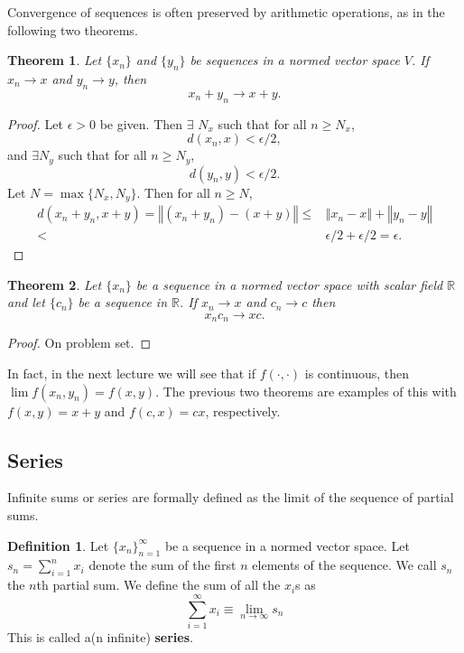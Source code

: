 \documentclass[12pt,reqno]{amsart}
\newtheorem{theorem}{Theorem}[section]
\theoremstyle{definition}
\newtheorem{definition}{Definition}[section]
\def\R{\mathbb{R}}
\newcommand{\norm}[1]{\left\Vert {#1} \right\Vert}
\newcommand{\seq}[1]{\{{#1}_n \}_{n=1}^\infty }
\begin{document}
Convergence of sequences is often preserved by arithmetic
operations, as in the following two theorems.
\begin{theorem}
  Let $\{x_n\}$ and $\{y_n\}$ be sequences in a normed vector space
  $V$. If $x_n \to x$ and $y_n \to y$, then
  \[ x_n + y_n \to x + y. \]
\end{theorem}
\begin{proof}
  Let $\epsilon > 0$ be given. Then $\exists$ $N_x$ such that for all
  $n \geq N_x$, 
  \[ d(x_n,x) < \epsilon/2,\] and $\exists N_y$ such that
  for all $n \geq N_y$,  
  \[ d(y_n,y) < \epsilon/2. \]
  Let $N =\max\{N_x,N_y\}$. Then for all $n \geq N$, 
  \begin{align*}
    d(x_n + y_n,x+y) = \norm{(x_n + y_n) - (x+y)} \leq & \norm{x_n -
      x} + \norm{y_n - y} \\
    < & \epsilon/2 + \epsilon /2  = \epsilon.
  \end{align*}  
\end{proof}
\begin{theorem}
  Let $\{x_n \}$ be a sequence in a normed vector space with scalar
  field $\R$ and let $\{c_n\}$ be a sequence in $\R$. If
  $x_n \to x$ and $c_n \to c$ then 
  \[ x_n c_n \to x c. \]
\end{theorem}
\begin{proof}
  On problem set. 
\end{proof}
In fact, in the next lecture we will see that if $f(\cdot,\cdot)$ is
continuous, then $\lim f(x_n, y_n) = f(x,y)$. The previous two
theorems are examples of this with $f(x,y) = x+y$ and $f(c,x) = c x$,
respectively.

\subsection{Series}

Infinite sums or series are formally defined as the limit of the
sequence of partial sums. 
\begin{definition}
  Let $\seq{x}$ be a sequence in a normed vector space. Let $s_n =
  \sum_{i=1}^n x_i$ denote the sum of the first $n$ elements of the
  sequence. We call $s_n$ the $n$th partial sum. We define the sum of
  all the $x_i$s as
  \[ \sum_{i=1}^\infty x_i \equiv \lim_{n \to \infty} s_n \]
  This is called a(n infinite) \textbf{series}. 
\end{definition}
\end{document}

